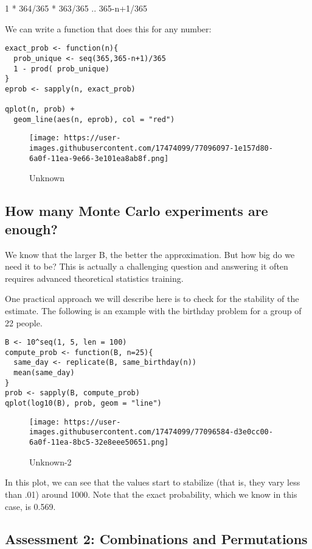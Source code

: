 \documentclass[
]{article}
\begin{document}
1 * 364/365 * 363/365 .. 365-n+1/365

We can write a function that does this for any number:

\begin{verbatim}
exact_prob <- function(n){
  prob_unique <- seq(365,365-n+1)/365 
  1 - prod( prob_unique)
}
eprob <- sapply(n, exact_prob)

qplot(n, prob) + 
  geom_line(aes(n, eprob), col = "red")
\end{verbatim}

\begin{figure}
\centering
\texttt{[image: https://user-images.githubusercontent.com/17474099/77096097-1e157d80-6a0f-11ea-9e66-3e101ea8ab8f.png]}
\caption{Unknown}
\end{figure}

\hypertarget{how-many-monte-carlo-experiments-are-enough}{%
\subsection{How many Monte Carlo experiments are
enough?}\label{how-many-monte-carlo-experiments-are-enough}}

We know that the larger B, the better the approximation. But how big do
we need it to be? This is actually a challenging question and answering
it often requires advanced theoretical statistics training.

One practical approach we will describe here is to check for the
stability of the estimate. The following is an example with the birthday
problem for a group of 22 people.

\begin{verbatim}
B <- 10^seq(1, 5, len = 100)
compute_prob <- function(B, n=25){
  same_day <- replicate(B, same_birthday(n))
  mean(same_day)
}
prob <- sapply(B, compute_prob)
qplot(log10(B), prob, geom = "line")
\end{verbatim}

\begin{figure}
\centering
\texttt{[image: https://user-images.githubusercontent.com/17474099/77096584-d3e0cc00-6a0f-11ea-8bc5-32e8eee50651.png]}
\caption{Unknown-2}
\end{figure}

In this plot, we can see that the values start to stabilize (that is,
they vary less than .01) around 1000. Note that the exact probability,
which we know in this case, is 0.569.

\hypertarget{assessment-2-combinations-and-permutations}{%
\subsection{Assessment 2: Combinations and
Permutations}\label{assessment-2-combinations-and-permutations}}
\end{document}
